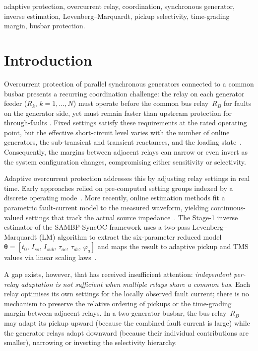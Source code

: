 \documentclass[journal,twoside,letterpaper]{IEEEtran}
\newcommand{\vect}[1]{\bm{#1}}
\begin{document}
\begin{IEEEkeywords}
adaptive protection, overcurrent relay, coordination,
synchronous generator, inverse estimation, Levenberg--Marquardt,
pickup selectivity, time-grading margin, busbar protection.
\end{IEEEkeywords}

\section{Introduction}
\label{sec:intro}

Overcurrent protection of parallel synchronous generators
connected to a common busbar presents a recurring coordination
challenge: the relay on each generator feeder
($R_k$, $k=1,\dots,N$) must operate before the common bus
relay~$R_B$ for faults on the generator side, yet must remain
faster than upstream protection for through-faults
\cite{Anderson1999,Blackburn2006}.
Fixed settings satisfy these requirements at the rated
operating point, but the effective short-circuit level varies
with the number of online generators, the
sub-transient and transient reactances, and the loading
state~\cite{IEEE1110_2002,Kundur1994}.
Consequently, the margins between adjacent relays can
narrow or even invert as the system configuration changes,
compromising either sensitivity or selectivity.

Adaptive overcurrent protection addresses this by adjusting
relay settings in real time.
Early approaches relied on pre-computed setting groups indexed
by a discrete operating mode~\cite{Urdaneta1988,Novosel1994}.
More recently, online estimation methods fit a parametric
fault-current model to the measured waveform, yielding
continuous-valued settings that track the actual source
impedance~\cite{Eluvathingal2025_TR01}.
The Stage-1 inverse estimator of the SAMBP-SyncOC framework
uses a two-pass Levenberg--Marquardt (LM) algorithm to extract
the six-parameter reduced model
$\vect\theta = [t_0,\,I_{ss},\,I_{sub},\,\tau_{ac},\,\tau_{dc},\,\varphi_a]$
and maps the result to adaptive pickup and TMS values via
linear scaling laws~\cite{Eluvathingal2025_TR01}.

A gap exists, however, that has received insufficient attention:
\emph{independent per-relay adaptation is not sufficient when
multiple relays share a common bus}.
Each relay optimises its own settings for the locally observed
fault current; there is no mechanism to preserve the relative
ordering of pickups or the time-grading margin between adjacent
relays.
In a two-generator busbar, the bus relay~$R_B$ may adapt its
pickup upward (because the combined fault current is large)
while the generator relays adapt downward (because their
individual contributions are smaller), narrowing or inverting
the selectivity hierarchy.
\end{document}
